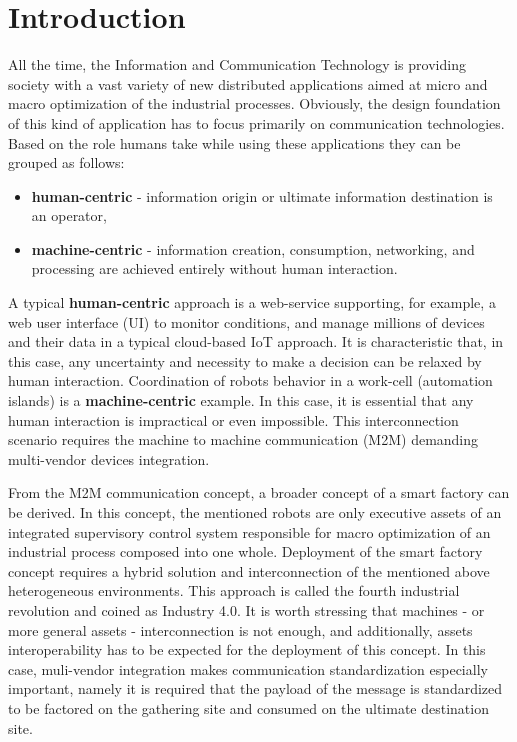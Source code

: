 \documentclass[
]{article}
\date{}
\providecommand{\tightlist}{%
  \setlength{\itemsep}{0pt}\setlength{\parskip}{0pt}}
\begin{document}
\hypertarget{introduction}{%
\section{Introduction}\label{introduction}}

All the time, the Information and Communication Technology is providing
society with a vast variety of new distributed applications aimed at
micro and macro optimization of the industrial processes. Obviously, the
design foundation of this kind of application has to focus primarily on
communication technologies. Based on the role humans take while using
these applications they can be grouped as follows:

\begin{itemize}
\tightlist
\item
  \textbf{human-centric} - information origin or ultimate information
  destination is an operator,
\item
  \textbf{machine-centric} - information creation, consumption,
  networking, and processing are achieved entirely without human
  interaction.
\end{itemize}

A typical \textbf{human-centric} approach is a web-service supporting,
for example, a web user interface (UI) to monitor conditions, and manage
millions of devices and their data in a typical cloud-based IoT
approach. It is characteristic that, in this case, any uncertainty and
necessity to make a decision can be relaxed by human interaction.
Coordination of robots behavior in a work-cell (automation islands) is a
\textbf{machine-centric} example. In this case, it is essential that any
human interaction is impractical or even impossible. This
interconnection scenario requires the machine to machine communication
(M2M) demanding multi-vendor devices integration.

From the M2M communication concept, a broader concept of a smart factory
can be derived. In this concept, the mentioned robots are only executive
assets of an integrated supervisory control system responsible for macro
optimization of an industrial process composed into one whole.
Deployment of the smart factory concept requires a hybrid solution and
interconnection of the mentioned above heterogeneous environments. This
approach is called the fourth industrial revolution and coined as
Industry 4.0. It is worth stressing that machines - or more general
assets - interconnection is not enough, and additionally, assets
interoperability has to be expected for the deployment of this concept.
In this case, muli-vendor integration makes communication
standardization especially important, namely it is required that the
payload of the message is standardized to be factored on the gathering
site and consumed on the ultimate destination site.
\end{document}

